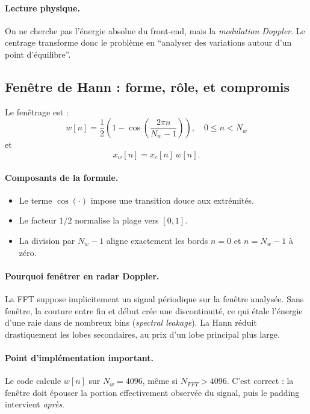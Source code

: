 \documentclass[a4paper,11pt]{article}
\begin{document}
\paragraph{Lecture physique.}
On ne cherche pas l'\'energie absolue du front-end, mais la \emph{modulation Doppler}. Le centrage transforme donc le probl\`eme en ``analyser des variations autour d'un point d'\'equilibre''.

\subsection{Fen\^etre de Hann : forme, r\^ole, et compromis}

Le fen\^etrage est :
\[
w[n] = \frac{1}{2}\left(1-\cos\left(\frac{2\pi n}{N_w-1}\right)\right), \quad 0\le n < N_w
\]
et
\[
x_w[n]=x_c[n]\,w[n].
\]

\paragraph{Composants de la formule.}
\begin{itemize}[leftmargin=2em]
  \item Le terme \(\cos(\cdot)\) impose une transition douce aux extr\'emit\'es.
  \item Le facteur \(1/2\) normalise la plage vers \([0,1]\).
  \item La division par \(N_w-1\) aligne exactement les bords \(n=0\) et \(n=N_w-1\) \`a z\'ero.
\end{itemize}

\paragraph{Pourquoi fen\^etrer en radar Doppler.}
La FFT suppose implicitement un signal p\'eriodique sur la fen\^etre analys\'ee. Sans fen\^etre, la couture entre fin et d\'ebut cr\'ee une discontinuit\'e, ce qui \'etale l'\'energie d'une raie dans de nombreux bins (\emph{spectral leakage}). La Hann r\'eduit drastiquement les lobes secondaires, au prix d'un lobe principal plus large.

\paragraph{Point d'impl\'ementation important.}
Le code calcule \(w[n]\) sur \(N_w=4096\), m\^eme si \(N_{FFT}>4096\). C'est correct : la fen\^etre doit \'epouser la portion effectivement observ\'ee du signal, puis le padding intervient \emph{apr\`es}.
\end{document}
